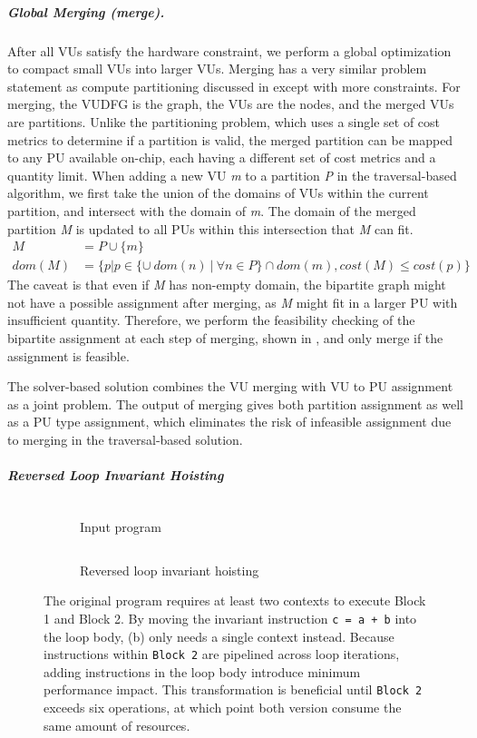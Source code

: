 \subparagraph{Global Merging (merge).}
After all VUs satisfy the hardware constraint, we perform a global optimization to compact small VUs into larger VUs. 
Merging has a very similar problem statement as compute partitioning discussed in
 except with more constraints.
For merging, the VUDFG is the graph, the VUs are the nodes, and the merged VUs are partitions.
Unlike the partitioning problem, which uses a single set of cost metrics to determine if a partition
is valid, the merged partition
can be mapped to any PU available on-chip, each having a different set of cost metrics and a
quantity limit.
When adding a new VU \emph{m} to a partition \emph{P} in the traversal-based algorithm, 
we first take the union of the domains of VUs within the current partition, and
intersect with the domain of \emph{m}.
The domain of the merged partition \emph{M} is updated to all PUs within this intersection that \emph{M} can fit.
\begin{align}
  M &= P \cup \{m\} \\
  dom(M) &= \{ p | p \in \{\cup\ dom(n)\ |\ \forall n \in P\} \cap dom(m), cost(M) \leq cost(p) \}
\end{align}
The caveat is that even if \emph{M} has non-empty domain, the bipartite graph might not have a possible 
assignment after merging, as \emph{M} might fit in a larger PU with insufficient quantity.
Therefore, we perform the feasibility checking of the bipartite assignment at each step
of merging, shown in , and only merge if the assignment is feasible.

The solver-based solution combines the VU merging with VU to PU assignment as a joint problem. 
The output of merging gives both partition assignment as well as a PU type assignment, which
eliminates the risk of infeasible assignment due to merging in the traversal-based solution.

\subparagraph{Reversed Loop Invariant Hoisting}

\begin{figure}
\centering
\hfill
\begin{subfigure}[b]{0.4\textwidth}
\inputminted{python}{code/hoisting.py}
\caption{Input program}
\end{subfigure}
\hfill
\begin{subfigure}[b]{0.4\textwidth}
\inputminted{python}{code/reversehoisting.py}
\caption{Reversed loop invariant hoisting}
\end{subfigure}
\hfill
\caption[Reversed loop invariant hoisting]{
  The original program requires at least two contexts to execute Block 1 and Block 2.
  By moving the invariant instruction \texttt{c = a + b} into the loop body, (b) only needs a single
  context instead. Because instructions within \texttt{Block 2} are pipelined across loop
  iterations, adding instructions in the loop body introduce minimum performance impact.
  This transformation is beneficial until \texttt{Block 2} exceeds six operations, at which point
  both version consume the same amount of resources.
}
\label{fig:reversehoisting}
\end{figure}

